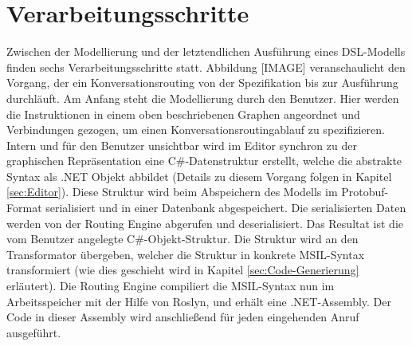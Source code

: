 \section{Verarbeitungsschritte}
\label{sec:Verarbeitungsschritte}
Zwischen der Modellierung und der letztendlichen Ausführung eines DSL-Modells finden sechs Verarbeitungsschritte statt. Abbildung [IMAGE] veranschaulicht den Vorgang, der ein Konversationsrouting von der Spezifikation bis zur Ausführung durchläuft. Am Anfang steht die Modellierung durch den Benutzer. Hier werden die Instruktionen in einem oben beschriebenen Graphen angeordnet und Verbindungen gezogen, um einen Konversationsroutingablauf zu spezifizieren. Intern und für den Benutzer unsichtbar wird im Editor synchron zu der graphischen Repräsentation eine C\#-Datenstruktur erstellt, welche die abstrakte Syntax als .NET Objekt abbildet (Details zu diesem Vorgang folgen in Kapitel \ref{sec:Editor}). Diese Struktur wird beim Abspeichern des Modells im Protobuf-Format serialisiert und in einer Datenbank abgespeichert. Die serialisierten Daten werden von der Routing Engine abgerufen und deserialisiert. Das Resultat ist die vom Benutzer angelegte C\#-Objekt-Struktur. Die Struktur wird an den Transformator übergeben, welcher die Struktur in konkrete MSIL-Syntax transformiert (wie dies geschieht wird in Kapitel \ref{sec:Code-Generierung} erläutert). Die Routing Engine compiliert die MSIL-Syntax nun im Arbeitsspeicher mit der Hilfe von Roslyn, und erhält eine .NET-Assembly. Der Code in dieser Assembly wird anschließend für jeden eingehenden Anruf ausgeführt. 
